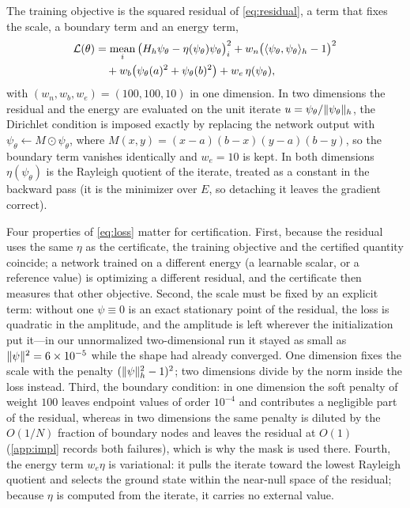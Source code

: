 The training objective is the squared residual of \eqref{eq:residual}, a term
that fixes the scale, a boundary term and an energy term,
\begin{equation}
  \begin{split}
  \mathcal L(\theta) &=
  \operatorname*{mean}_{i}\big(H_h\psi_\theta-\eta(\psi_\theta)\psi_\theta\big)_i^2
  + w_n\big(\langle\psi_\theta,\psi_\theta\rangle_h-1\big)^2 \\
  &\quad + w_b\big(\psi_\theta(a)^2+\psi_\theta(b)^2\big)
  + w_e\,\eta(\psi_\theta),
  \end{split}
  \label{eq:loss}
\end{equation}
with $(w_n,w_b,w_e)=(100,100,10)$ in one dimension. In two dimensions the
residual and the energy are evaluated on the unit iterate
$u=\psi_\theta/\lVert \psi_\theta\rVert_h$, the Dirichlet condition is imposed
exactly by replacing the network output with
$\psi_\theta\leftarrow M\odot\psi_\theta$, where
$M(x,y)=(x-a)(b-x)(y-a)(b-y)$, so the boundary term vanishes identically and
$w_e=10$ is kept. In both dimensions $\eta(\psi_\theta)$ is the Rayleigh
quotient of the iterate, treated as a constant in the backward pass (it is the
minimizer over $E$, so detaching it leaves the gradient correct).

Four properties of \eqref{eq:loss} matter for certification. First, because
the residual uses the same $\eta$ as the certificate, the training objective
and the certified quantity coincide; a network trained on a different energy
(a learnable scalar, or a reference value) is optimizing a different residual,
and the certificate then measures that other objective. Second, the scale must
be fixed by an explicit term: without one $\psi\equiv0$ is an exact stationary
point of the residual, the loss is quadratic in the amplitude, and the amplitude is
left wherever the initialization put it---in our unnormalized two-dimensional
run it stayed as small as $\lVert \psi\rVert^2=6\times10^{-5}$ while the shape had
already converged. One dimension fixes the scale with the penalty
$(\lVert \psi\rVert_h^2-1)^2$; two dimensions divide by the norm inside the loss
instead. Third, the boundary condition: in one dimension the soft penalty of
weight $100$ leaves endpoint values of order $10^{-4}$ and contributes a
negligible part of the residual, whereas in two dimensions the same penalty is
diluted by the $O(1/N)$ fraction of boundary nodes and leaves the residual at
$O(1)$ (\ref{app:impl} records both failures), which is why the mask is used
there. Fourth, the energy term $w_e\eta$ is variational: it pulls the iterate
toward the lowest Rayleigh quotient and selects the ground state within the
near-null space of the residual; because $\eta$ is computed from the iterate,
it carries no external value.

